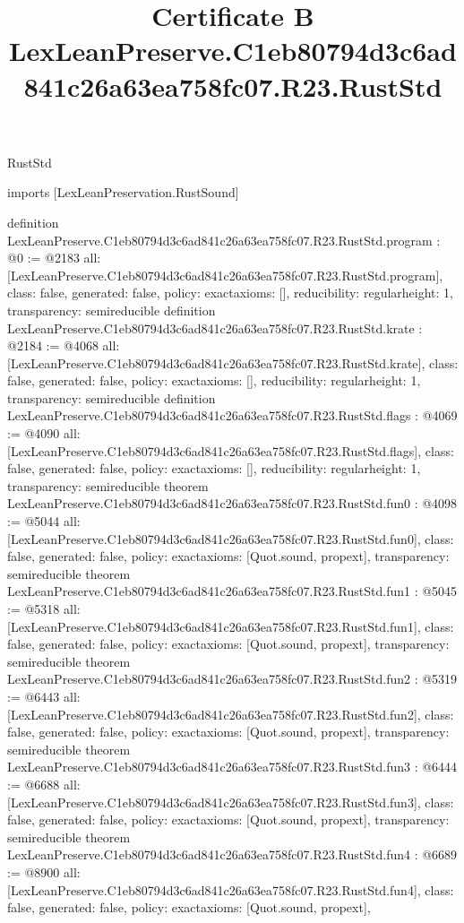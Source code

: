 \begin{lexlean}{RustStd}
\title{Certificate B LexLeanPreserve.C1eb80794d3c6ad841c26a63ea758fc07.R23.RustStd}
\begin{coremodule}
imports [LexLeanPreservation.RustSound]

definition LexLeanPreserve.C1eb80794d3c6ad841c26a63ea758fc07.R23.RustStd.program : @0 := @2183 {
  all: [LexLeanPreserve.C1eb80794d3c6ad841c26a63ea758fc07.R23.RustStd.program],
  class: false,
  generated: false,
  policy: exact{axioms: []},
  reducibility: regular{height: 1},
  transparency: semireducible
}
definition LexLeanPreserve.C1eb80794d3c6ad841c26a63ea758fc07.R23.RustStd.krate : @2184 := @4068 {
  all: [LexLeanPreserve.C1eb80794d3c6ad841c26a63ea758fc07.R23.RustStd.krate],
  class: false,
  generated: false,
  policy: exact{axioms: []},
  reducibility: regular{height: 1},
  transparency: semireducible
}
definition LexLeanPreserve.C1eb80794d3c6ad841c26a63ea758fc07.R23.RustStd.flags : @4069 := @4090 {
  all: [LexLeanPreserve.C1eb80794d3c6ad841c26a63ea758fc07.R23.RustStd.flags],
  class: false,
  generated: false,
  policy: exact{axioms: []},
  reducibility: regular{height: 1},
  transparency: semireducible
}
theorem LexLeanPreserve.C1eb80794d3c6ad841c26a63ea758fc07.R23.RustStd.fun0 : @4098 := @5044 {
  all: [LexLeanPreserve.C1eb80794d3c6ad841c26a63ea758fc07.R23.RustStd.fun0],
  class: false,
  generated: false,
  policy: exact{axioms: [Quot.sound, propext]},
  transparency: semireducible
}
theorem LexLeanPreserve.C1eb80794d3c6ad841c26a63ea758fc07.R23.RustStd.fun1 : @5045 := @5318 {
  all: [LexLeanPreserve.C1eb80794d3c6ad841c26a63ea758fc07.R23.RustStd.fun1],
  class: false,
  generated: false,
  policy: exact{axioms: [Quot.sound, propext]},
  transparency: semireducible
}
theorem LexLeanPreserve.C1eb80794d3c6ad841c26a63ea758fc07.R23.RustStd.fun2 : @5319 := @6443 {
  all: [LexLeanPreserve.C1eb80794d3c6ad841c26a63ea758fc07.R23.RustStd.fun2],
  class: false,
  generated: false,
  policy: exact{axioms: [Quot.sound, propext]},
  transparency: semireducible
}
theorem LexLeanPreserve.C1eb80794d3c6ad841c26a63ea758fc07.R23.RustStd.fun3 : @6444 := @6688 {
  all: [LexLeanPreserve.C1eb80794d3c6ad841c26a63ea758fc07.R23.RustStd.fun3],
  class: false,
  generated: false,
  policy: exact{axioms: [Quot.sound, propext]},
  transparency: semireducible
}
theorem LexLeanPreserve.C1eb80794d3c6ad841c26a63ea758fc07.R23.RustStd.fun4 : @6689 := @8900 {
  all: [LexLeanPreserve.C1eb80794d3c6ad841c26a63ea758fc07.R23.RustStd.fun4],
  class: false,
  generated: false,
  policy: exact{axioms: [Quot.sound, propext]},
}
\end{coremodule}
\end{lexlean}
